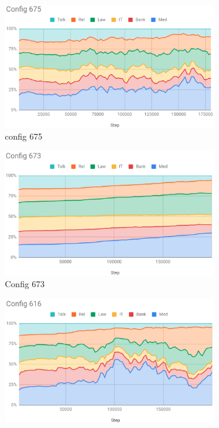 \documentclass[12pt,times,a4paper,twoside]{article}
\theoremstyle{definition}
\begin{document}
\begin{figure}[htb]
\begin{subfigure}{.5\textwidth}
  \centering
  \includegraphics[width=.8\linewidth]{config675.png}  
  \caption{config 675}
  \label{fig:675}
\end{subfigure}
\begin{subfigure}{.5\textwidth}
  \centering
  \includegraphics[width=.8\linewidth]{config673.png}  
  \caption{Config 673}
  \label{fig:673}
\end{subfigure}
\newline
\begin{subfigure}{.5\textwidth}
  \centering
  \includegraphics[width=.8\linewidth]{config616.png}  

\end{subfigure}
\end{figure}
\end{document}
